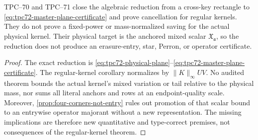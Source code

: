 \begin{theorem}
\label{thm:primitive-frontier}
TPC--70 and TPC--71 close the algebraic reduction from a cross-key rectangle
to \eqref{eq:tpc72-master-plane-certificate} and prove cancellation for
regular kernels.  They do not prove a fixed-power or mass-normalized saving
for the actual physical kernel.  Their physical target is the anchored
mixed scalar \(\mathfrak X_{\mathfrak a}\), so the reduction does not
produce an erasure-entry, star, Perron, or operator certificate.
\end{theorem}

\begin{proof}
The exact reduction is
\eqref{eq:tpc72-physical-plane}--\eqref{eq:tpc72-master-plane-certificate}.
The regular-kernel corollary normalizes by \(\|K\|_\infty UV\).
No audited theorem bounds the actual kernel's mixed variation or tail
relative to the physical mass, nor sums all literal anchors and rows at an
endpoint-quality scale.  Moreover,
\cref{prop:four-corners-not-entry} rules out promotion of that scalar bound
to an entrywise operator majorant without a new representation.  The
missing implications are therefore new quantitative and type-correct
premises, not consequences of the regular-kernel theorem.
\end{proof}
